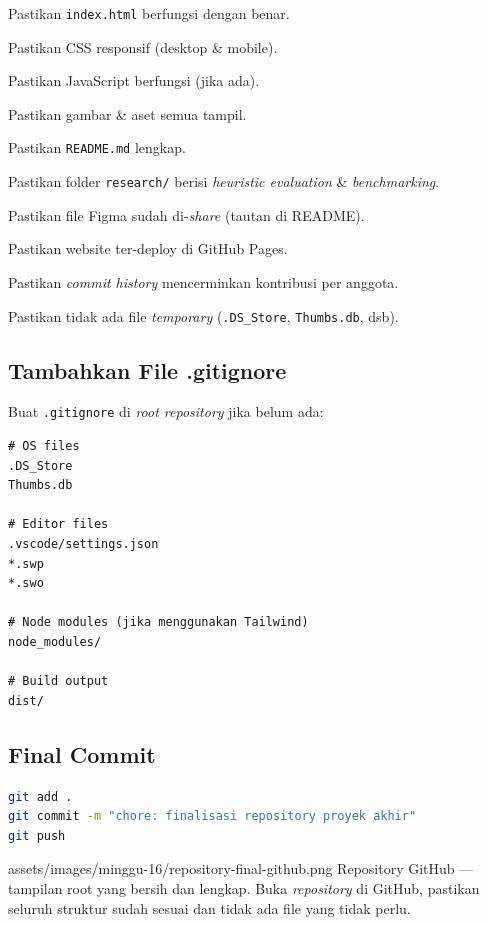 \begin{langkah}
  \item Pastikan \texttt{index.html} berfungsi dengan benar.
  \item Pastikan CSS responsif (desktop \& mobile).
  \item Pastikan JavaScript berfungsi (jika ada).
  \item Pastikan gambar \& aset semua tampil.
  \item Pastikan \texttt{README.md} lengkap.
  \item Pastikan folder \texttt{research/} berisi \emph{heuristic evaluation} \& \emph{benchmarking}.
  \item Pastikan file Figma sudah di-\emph{share} (tautan di README).
  \item Pastikan website ter-deploy di GitHub Pages.
  \item Pastikan \emph{commit history} mencerminkan kontribusi per anggota.
  \item Pastikan tidak ada file \emph{temporary} (\texttt{.DS\_Store}, \texttt{Thumbs.db}, dsb).
\end{langkah}

\subsection{Tambahkan File .gitignore}
\label{subsec:gitignore}

Buat \texttt{.gitignore} di \emph{root repository} jika belum ada:

\begin{lstlisting}[caption={Contoh file .gitignore}]
# OS files
.DS_Store
Thumbs.db

# Editor files
.vscode/settings.json
*.swp
*.swo

# Node modules (jika menggunakan Tailwind)
node_modules/

# Build output
dist/
\end{lstlisting}

\subsection{Final Commit}
\label{subsec:final-commit}

\begin{lstlisting}[language=bash, caption={Final commit proyek akhir}]
git add .
git commit -m "chore: finalisasi repository proyek akhir"
git push
\end{lstlisting}

\begin{tangkapanlayar}
  {assets/images/minggu-16/repository-final-github.png}
  {Repository GitHub --- tampilan root yang bersih dan lengkap.}
  {Buka \emph{repository} di GitHub, pastikan seluruh struktur sudah sesuai dan tidak ada file yang tidak perlu.}
\end{tangkapanlayar}

